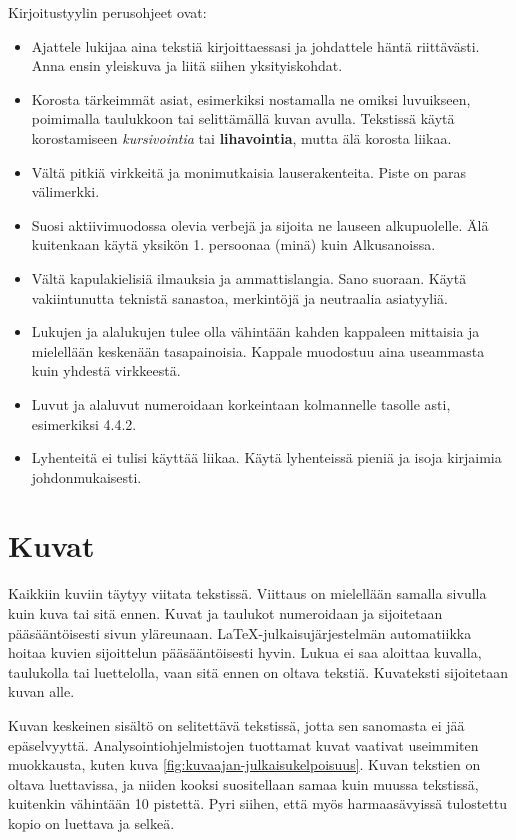 \documentclass[globalnumbering,centeredcaptions,draftfooter]{tutthesis/tutthesis} %
\begin{document}
Kirjoitustyylin perusohjeet ovat:
\begin{itemize} %
  \item Ajattele lukijaa aina tekstiä kirjoittaessasi ja johdattele häntä riittävästi. Anna ensin yleiskuva ja liitä siihen yksityiskohdat. 
  \item Korosta tärkeimmät asiat, esimerkiksi nostamalla ne omiksi luvuikseen, poimimalla taulukkoon tai selittämällä kuvan avulla. Tekstissä käytä korostamiseen \emph{kursivointia} tai \textbf{lihavointia}, mutta älä korosta liikaa.
  \item Vältä pitkiä virkkeitä ja monimutkaisia lauserakenteita. Piste on paras välimerkki. 
  \item Suosi aktiivimuodossa olevia verbejä ja sijoita ne lauseen alkupuolelle. Älä kuitenkaan käytä yksikön 1. persoonaa (minä) kuin Alkusanoissa. 
  \item Vältä kapulakielisiä ilmauksia ja ammattislangia. Sano suoraan. Käytä vakiintunutta teknistä sanastoa, merkintöjä ja neutraalia asiatyyliä. 
  \item Lukujen ja alalukujen tulee olla vähintään kahden kappaleen mittaisia ja mielellään keskenään tasapainoisia. Kappale muodostuu aina useammasta kuin yhdestä virkkeestä. 
  \item Luvut ja alaluvut numeroidaan korkeintaan kolmannelle tasolle asti, esimerkiksi 4.4.2.
  \item Lyhenteitä ei tulisi käyttää liikaa. Käytä lyhenteissä pieniä ja isoja kirjaimia johdonmukaisesti. 
\end{itemize}

\section{Kuvat}

Kaikkiin kuviin täytyy viitata tekstissä.
Viittaus on mielellään samalla sivulla kuin kuva tai sitä ennen.
Kuvat ja taulukot numeroidaan ja sijoitetaan pääsääntöisesti sivun yläreunaan.
LaTeX-julkaisujärjestelmän automatiikka hoitaa kuvien sijoittelun pääsääntöisesti hyvin.
Lukua ei saa aloittaa kuvalla, taulukolla tai luettelolla, vaan sitä ennen on oltava tekstiä.
Kuvateksti sijoitetaan kuvan alle.

Kuvan keskeinen sisältö on selitettävä tekstissä, jotta sen sanomasta ei jää epäselvyyttä.
Analysointiohjelmistojen tuottamat kuvat vaativat useimmiten muokkausta, kuten kuva \ref{fig:kuvaajan-julkaisukelpoisuus}.
Kuvan tekstien on oltava luettavissa, ja niiden kooksi suositellaan samaa kuin muussa tekstissä, kuitenkin vähintään 10 pistettä.
Pyri siihen, että myös harmaasävyissä tulostettu kopio on luettava ja selkeä.
\end{document}
